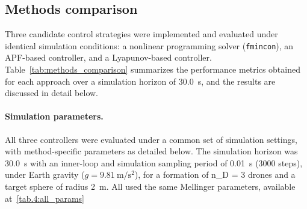 \subsection{Methods comparison}
\label{sec.4:Methods comparison}

Three candidate control strategies were implemented and evaluated under identical simulation conditions: a nonlinear programming solver (\texttt{fmincon}), an \gls{APF}-based controller, and a Lyapunov-based controller. Table~\ref{tab:methods_comparison} summarizes the performance metrics obtained for each approach over a simulation horizon of \SI{30.0}{\second}, and the results are discussed in detail below.

\paragraph{Simulation parameters.} All three controllers were evaluated under a common set of simulation settings, with method-specific parameters as detailed below. The simulation horizon was \SI{30.0}{\second} with an inner-loop and simulation sampling period of \SI{0.01}{\second} (\num{3000} steps), under Earth gravity ($g = \SI{9.81}{\meter\per\second\squared}$), for a formation of \gls{n_D} = 3 drones and a target sphere of radius \SI{2}{\meter}. All used the same Mellinger parameters, available at~\ref{tab.4:all_params}

